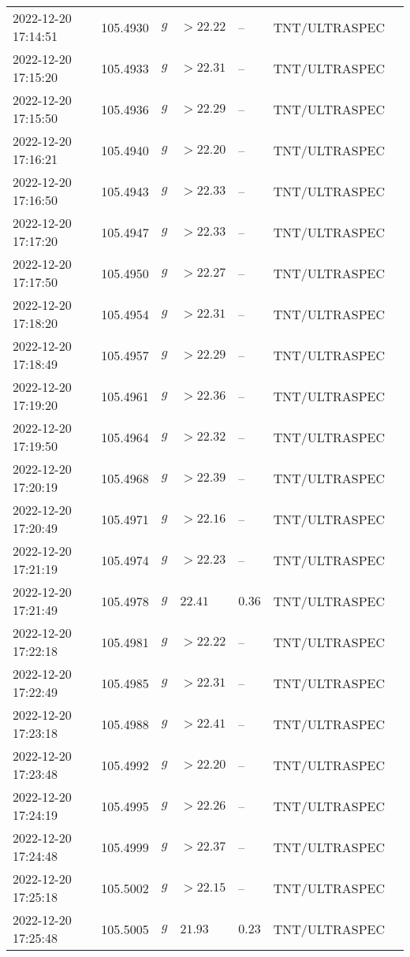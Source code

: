 \documentclass{nature_plusfigure}
\begin{document}
\begin{supplement}
\begin{center}
\begin{longtable}{lllllll}
2022-12-20 17:14:51 & 105.4930 & $g$ & $>22.22$ & -- & TNT/ULTRASPEC &  \\ 
2022-12-20 17:15:20 & 105.4933 & $g$ & $>22.31$ & -- & TNT/ULTRASPEC &  \\ 
2022-12-20 17:15:50 & 105.4936 & $g$ & $>22.29$ & -- & TNT/ULTRASPEC &  \\ 
2022-12-20 17:16:21 & 105.4940 & $g$ & $>22.20$ & -- & TNT/ULTRASPEC &  \\ 
2022-12-20 17:16:50 & 105.4943 & $g$ & $>22.33$ & -- & TNT/ULTRASPEC &  \\ 
2022-12-20 17:17:20 & 105.4947 & $g$ & $>22.33$ & -- & TNT/ULTRASPEC &  \\ 
2022-12-20 17:17:50 & 105.4950 & $g$ & $>22.27$ & -- & TNT/ULTRASPEC &  \\ 
2022-12-20 17:18:20 & 105.4954 & $g$ & $>22.31$ & -- & TNT/ULTRASPEC &  \\ 
2022-12-20 17:18:49 & 105.4957 & $g$ & $>22.29$ & -- & TNT/ULTRASPEC &  \\ 
2022-12-20 17:19:20 & 105.4961 & $g$ & $>22.36$ & -- & TNT/ULTRASPEC &  \\ 
2022-12-20 17:19:50 & 105.4964 & $g$ & $>22.32$ & -- & TNT/ULTRASPEC &  \\ 
2022-12-20 17:20:19 & 105.4968 & $g$ & $>22.39$ & -- & TNT/ULTRASPEC &  \\ 
2022-12-20 17:20:49 & 105.4971 & $g$ & $>22.16$ & -- & TNT/ULTRASPEC &  \\ 
2022-12-20 17:21:19 & 105.4974 & $g$ & $>22.23$ & -- & TNT/ULTRASPEC &  \\ 
2022-12-20 17:21:49 & 105.4978 & $g$ & $22.41$ & $0.36$ & TNT/ULTRASPEC &  \\ 
2022-12-20 17:22:18 & 105.4981 & $g$ & $>22.22$ & -- & TNT/ULTRASPEC &  \\ 
2022-12-20 17:22:49 & 105.4985 & $g$ & $>22.31$ & -- & TNT/ULTRASPEC &  \\ 
2022-12-20 17:23:18 & 105.4988 & $g$ & $>22.41$ & -- & TNT/ULTRASPEC &  \\ 
2022-12-20 17:23:48 & 105.4992 & $g$ & $>22.20$ & -- & TNT/ULTRASPEC &  \\ 
2022-12-20 17:24:19 & 105.4995 & $g$ & $>22.26$ & -- & TNT/ULTRASPEC &  \\ 
2022-12-20 17:24:48 & 105.4999 & $g$ & $>22.37$ & -- & TNT/ULTRASPEC &  \\ 
2022-12-20 17:25:18 & 105.5002 & $g$ & $>22.15$ & -- & TNT/ULTRASPEC &  \\ 
2022-12-20 17:25:48 & 105.5005 & $g$ & $21.93$ & $0.23$ & TNT/ULTRASPEC &  \\ 

\end{longtable}
\end{center}
\end{supplement}
\end{document}
